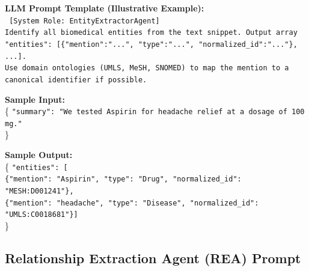 \documentclass{article}
\begin{document}
\begin{tcolorbox}[colframe=black!25, colback=black!5, boxrule=0.5pt, arc=2pt]
\vspace{1mm}
\noindent
\textbf{LLM Prompt Template (Illustrative Example):}\\
\texttt{
[System Role: EntityExtractorAgent]\\
Identify all biomedical entities from the text snippet. Output array "entities": [\{"mention":"...", "type":"...", "normalized\_id":"..."\}, ...].\\
Use domain ontologies (UMLS, MeSH, SNOMED) to map the mention to a canonical identifier if possible.
}

\vspace{1mm}
\noindent
\textbf{Sample Input:}\\
\{
  \texttt{"summary": "We tested Aspirin for headache relief at a dosage of 100 mg."}\\
\}

\vspace{1mm}
\noindent
\textbf{Sample Output:}\\
\{
  \texttt{"entities": [}\\
  \quad \texttt{\{"mention": "Aspirin", "type": "Drug", "normalized\_id": "MESH:D001241"\},}\\
  \quad \texttt{\{"mention": "headache", "type": "Disease", "normalized\_id": "UMLS:C0018681"\}]}\\
\}
\end{tcolorbox}
\newpage

\subsection{Relationship Extraction Agent (REA) Prompt}
\label{appendix:rea_prompt}
\end{document}
